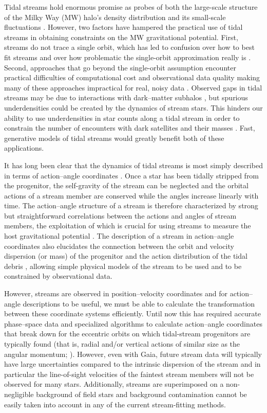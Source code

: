 \documentclass[12pt,preprint]{aastex}
\newcommand{\eg}{e.g.}
\begin{document}
Tidal streams hold enormous promise as probes of both the large-scale
structure of the Milky Way (MW) halo's density distribution
\citep[\eg,][]{Johnston99a,Koposov10a} and its small-scale
fluctuations \citep{Carlberg12a}. However, two factors
have hampered the practical use of tidal streams in obtaining
constraints on the MW gravitational potential. First, streams do not
trace a single orbit, which has led to confusion over how to best fit
streams and over how problematic the single-orbit approximation really
is \citep{Eyre11a,Sanders13a}. Second, approaches that go beyond the
single-orbit assumption encounter practical difficulties of
computational cost and observational data quality making many of these
approaches impractical for real, noisy data
\citep{Sanders13b,PriceWhelan13a}. Observed gaps in tidal streams may
be due to interactions with dark--matter subhalos \citep{Yoon11a}, but
spurious underdensities could be created by the dynamics of stream
stars. This hinders our ability to use underdensities in star counts
along a tidal stream in order to constrain the number of encounters
with dark satellites and their masses \citep{Ngan14a}. Fast,
generative models of tidal streams would greatly benefit both of these
applications.

It has long been clear that the dynamics of tidal streams is most
simply described in terms of action--angle coordinates
\citep{Tremaine99a,Helmi99a}. Once a star has been tidally stripped
from the progenitor, the self-gravity of the stream can be neglected
and the orbital actions of a stream member are conserved while the
angles increase linearly with time. The action--angle structure of a
stream is therefore characterized by strong but straightforward
correlations between the actions and angles of stream members, the
exploitation of which is crucial for using streams to measure the host
gravitational potential \citep{Sanders13b}. The description of a
stream in action--angle coordinates also elucidates the connection
between the orbit and velocity dispersion (or mass) of the progenitor
and the action distribution of the tidal debris \citep{Eyre11a},
allowing simple physical models of the stream to be used and to be
constrained by observational data.

However, streams are observed in position--velocity coordinates and
for action--angle descriptions to be useful, we must be able to
calculate the transformation between these coordinate systems
efficiently. Until now this has required accurate phase--space data
\citep{Sanders13b} and specialized algorithms to calculate
action--angle coordinates that break down for the eccentric orbits on
which tidal-stream progenitors are typically found (that is, radial
and/or vertical actions of similar size as the angular momentum;
\citealt{Sanders12a}). However, even with Gaia, future stream data
will typically have large uncertainties compared to the intrinsic
dispersion of the stream and in particular the line-of-sight
velocities of the faintest stream members will not be observed for
many stars. Additionally, streams are superimposed on a non-negligible
background of field stars and background contamination cannot be
easily taken into account in any of the current stream-fitting
methods.
\end{document}
